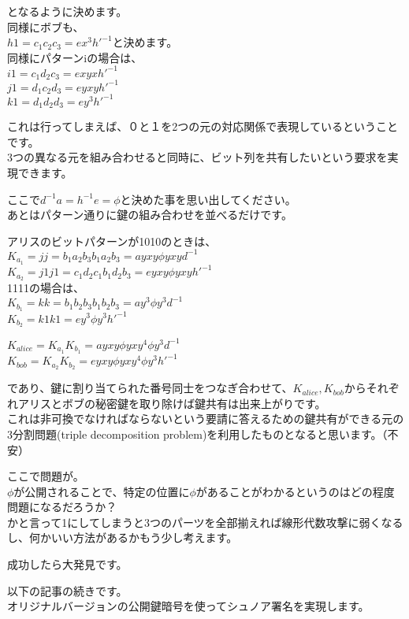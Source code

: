 \documentclass[
]{article}
\begin{document}
となるように決めます。\\
同様にボブも、\\
\(h1=c_1c_2c_3=ex^3h'^{-1}\)と決めます。\\
同様にパターンiの場合は、\\
\(i1=c_1d_2c_3=exyxh'^{-1}\)\\
\(j1=d_1c_2d_3=eyxyh'^{-1}\)\\
\(k1=d_1d_2d_3=ey^3h'^{-1}\)

これは行ってしまえば、０と１を2つの元の対応関係で表現しているということです。\\
3つの異なる元を組み合わせると同時に、ビット列を共有したいという要求を実現できます。

ここで\(d^{-1}a=h^{-1}e=\phi\)と決めた事を思い出してください。\\
あとはパターン通りに鍵の組み合わせを並べるだけです。

アリスのビットパターンが1010のときは、\\
\(K_{a_1}=jj=b_1a_2b_3b_1a_2b_3=ayxy\phi yxyd^{-1}\)\\
\(K_{a_2}=j1j1=c_1d_2c_1b_1d_2b_3=eyxy\phi yxyh'^{-1}\)\\
1111の場合は、\\
\(K_{b_1}=kk=b_1b_2b_3b_1b_2b_3=ay^3\phi y^3d^{-1}\)\\
\(K_{b_2}=k1k1=ey^3\phi y^3h'^{-1}\)

\(K_{alice}=K_{a_1}K_{b_1}=ayxy\phi yxy^4\phi y^3d^{-1}\)\\
\(K_{bob}=K_{a_2}K_{b_2}=eyxy\phi yxy^4\phi y^3h'^{-1}\)

であり、鍵に割り当てられた番号同士をつなぎ合わせて、\(K_{alice},K_{bob}\)からそれぞれアリスとボブの秘密鍵を取り除けば鍵共有は出来上がりです。\\
これは非可換でなければならないという要請に答えるための鍵共有ができる元の3分割問題(triple
decomposition problem)を利用したものとなると思います。（不安）

ここで問題が。\\
\(\phi\)が公開されることで、特定の位置に\(\phi\)があることがわかるというのはどの程度問題になるだろうか？\\
かと言って1にしてしまうと3つのパーツを全部揃えれば線形代数攻撃に弱くなるし、何かいい方法があるかもう少し考えます。

成功したら大発見です。

以下の記事の続きです。\\
オリジナルバージョンの公開鍵暗号を使ってシュノア署名を実現します。
\end{document}

